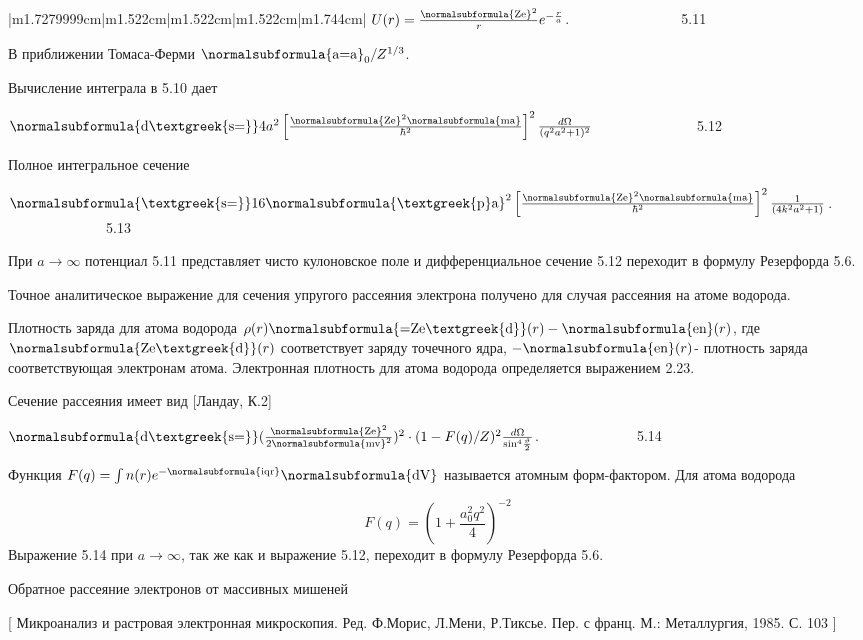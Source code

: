 \documentclass[a4paper,14pt, openany, twoside, draft]{extbook} %
\begin{document}
\begin{flushleft}
\begin{supertabular}{|m{1.7279999cm}|m{1.522cm}|m{1.522cm}|m{1.522cm}|m{1.744cm}|}
 $U(r)=\frac{\normalsubformula{\text{Ze}}^2} re^{-\frac r a}$.\ \ \ \ \ \ \ \ \ \ \ \ \ \ \ \ 5.11

В приближении Томаса-Ферми  $\normalsubformula{\text{a=a}}_0/Z^{1/3}$.

Вычисление интеграла в 5.10 дает\ \

 $\normalsubformula{\text{d\textgreek{s=}}}4a^2\left[\frac{\normalsubformula{\text{Ze}}^2\normalsubformula{\text{ma}}}{\hbar ^2}\right]^2\frac{d\Omega }{(q^2a^2+1)^2}$ \ \ \ \ \ \ \ \ \ \ \ \ \ \ 5.12

Полное интегральное сечение

 $\normalsubformula{\text{\textgreek{s=}}}16\normalsubformula{\text{\textgreek{p}a}}^2\left[\frac{\normalsubformula{\text{Ze}}^2\normalsubformula{\text{ma}}}{\hbar ^2}\right]^2\frac 1{(4k^2a^2+1)}$. \ \ \ \ \ \ \ \ \ \ \ \ \ \ 5.13

При  $a\rightarrow \infty $ потенциал 5.11 представляет чисто кулоновское поле и дифференциальное сечение 5.12 переходит в формулу Резерфорда 5.6.

Точное аналитическое выражение для сечения упругого рассеяния электрона получено для случая рассеяния на атоме водорода.

Плотность заряда для атома водорода  $\rho (r)\normalsubformula{\text{=Ze\textgreek{d}}}(r)-\normalsubformula{\text{en}}(r)$, где  $\normalsubformula{\text{Ze\textgreek{d}}}(r)$ соответствует заряду точечного ядра, $-\normalsubformula{\text{en}}(r)${}- плотность заряда соответствующая электронам атома. Электронная плотность для атома водорода определяется выражением 2.23.

Сечение рассеяния имеет вид [Ландау, К.2]

 $\normalsubformula{\text{d\textgreek{s=}}}(\frac{\normalsubformula{\text{Ze}}^2}{2\normalsubformula{\text{mv}}^2})^2\cdot (1-F(q)/Z)^2\frac{d\Omega }{\text{sin}^4\frac{\vartheta } 2}$.\ \ \ \ \ \ \ \ \ \ \ \ \ \ 5.14

Функция  $F(q)=\int n(r)e^{-\normalsubformula{\text{iqr}}}\normalsubformula{\text{dV}}$ называется атомным форм-фактором. Для атома водорода

\begin{equation*}
F(q)=(1+\frac{a_0^2q^2} 4)^{-2}
\end{equation*}
Выражение 5.14 при  $a\rightarrow \infty $, так же как и выражение 5.12,  переходит в формулу Резерфорда 5.6.

Обратное рассеяние электронов от массивных мишеней

[ Микроанализ и растровая электронная микроскопия. Ред. Ф.Морис, Л.Мени, Р.Тиксье. Пер. с франц. М.: Металлургия, 1985. С. 103 ]


\end{supertabular}
\end{flushleft}
\end{document}
